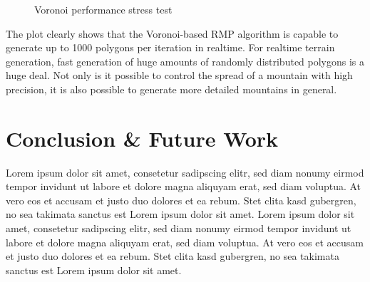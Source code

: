 \documentclass[11pt,a4paper,twoside,openright]{report}
\begin{document}
\begin{figure}[h]
\centering
{}
\caption{Voronoi performance stress test}
\label{fig:voronoiperformancestresstest}
\end{figure}
The plot clearly shows that the Voronoi-based RMP algorithm is capable to generate up to 1000 polygons per iteration in realtime. For realtime terrain generation, fast generation of huge amounts of randomly distributed polygons is a huge deal. Not only is it possible to control the spread of a mountain with high precision, it is also possible to generate more detailed mountains in general.

\chapter{Conclusion \& Future Work}
\label{sec:concl}

Lorem ipsum dolor sit amet, consetetur sadipscing elitr, sed diam nonumy
eirmod tempor invidunt ut labore et dolore magna aliquyam erat, sed diam voluptua. At
vero eos et accusam et justo duo dolores et ea rebum. Stet clita kasd gubergren, no sea
takimata sanctus est Lorem ipsum dolor sit amet. Lorem ipsum dolor sit amet, consetetur
sadipscing elitr, sed diam nonumy eirmod tempor invidunt ut labore et dolore magna
aliquyam erat, sed diam voluptua. At vero eos et accusam et justo duo dolores et ea
rebum. Stet clita kasd gubergren, no sea takimata sanctus est Lorem ipsum dolor sit amet.






\end{document}
